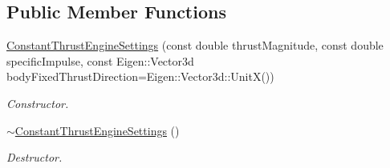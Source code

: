 \subsection*{Public Member Functions}
\begin{DoxyCompactItemize}
\item 
\hyperlink{classtudat_1_1simulation__setup_1_1ConstantThrustEngineSettings_a0564b55ceaea5934f6bcf72b839c9101}{Constant\+Thrust\+Engine\+Settings} (const double thrust\+Magnitude, const double specific\+Impulse, const Eigen\+::\+Vector3d body\+Fixed\+Thrust\+Direction=Eigen\+::\+Vector3d\+::\+UnitX())
\begin{DoxyCompactList}\small\item\em Constructor. \end{DoxyCompactList}\item 
\hyperlink{classtudat_1_1simulation__setup_1_1ConstantThrustEngineSettings_ae29e3a6bdb3c0b09d0bdc51ba1089ee5}{$\sim$\+Constant\+Thrust\+Engine\+Settings} ()\hypertarget{classtudat_1_1simulation__setup_1_1ConstantThrustEngineSettings_ae29e3a6bdb3c0b09d0bdc51ba1089ee5}{}\label{classtudat_1_1simulation__setup_1_1ConstantThrustEngineSettings_ae29e3a6bdb3c0b09d0bdc51ba1089ee5}

\begin{DoxyCompactList}\small\item\em Destructor. \end{DoxyCompactList}\end{DoxyCompactItemize}
